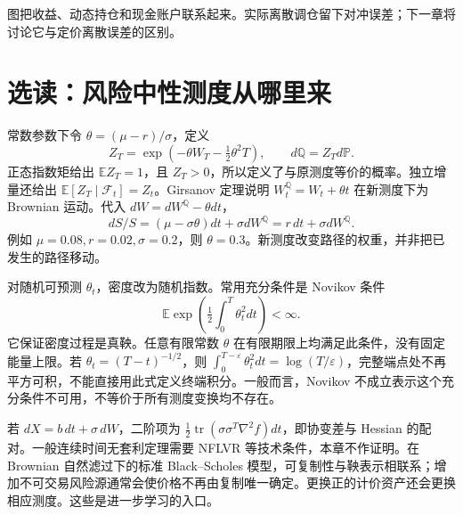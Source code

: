 
图把收益、动态持仓和现金账户联系起来。实际离散调仓留下对冲误差；下一章将讨论它与定价离散误差的区别\cite{black1973pricing,merton1973rational,shreve2004stochastic}。

\section{选读：风险中性测度从哪里来}
常数参数下令 $\theta=(\mu-r)/\sigma$，定义
\[
Z_T=\exp(-\theta W_T-\tfrac12\theta^2T),\qquad d\mathbb Q=Z_Td\mathbb P.
\]
正态指数矩给出 $\mathbb EZ_T=1$，且 $Z_T>0$，所以定义了与原测度等价的概率。独立增量还给出 $\mathbb E[Z_T\mid\mathcal F_t]=Z_t$。Girsanov 定理说明 $W_t^{\mathbb Q}=W_t+\theta t$ 在新测度下为 Brownian 运动。代入 $dW=dW^{\mathbb Q}-\theta dt$，
\[
dS/S=(\mu-\sigma\theta)dt+\sigma dW^{\mathbb Q}=r\,dt+\sigma dW^{\mathbb Q}.
\]
例如 $\mu=0.08,r=0.02,\sigma=0.2$，则 $\theta=0.3$。新测度改变路径的权重，并非把已发生的路径移动。


对随机可预测 $\theta_t$，密度改为随机指数。常用充分条件是 Novikov 条件
\[
\mathbb E\exp\left(\tfrac12\int_0^T\theta_t^2dt\right)<\infty.
\]
它保证密度过程是真鞅。任意有限常数 $\theta$ 在有限期限上均满足此条件，没有固定能量上限。若 $\theta_t=(T-t)^{-1/2}$，则 $\int_0^{T-\varepsilon}\theta_t^2dt=\log(T/\varepsilon)$，完整端点处不再平方可积，不能直接用此式定义终端积分。一般而言，Novikov 不成立表示这个充分条件不可用，不等价于所有测度变换均不存在。

若 $dX=b\,dt+\sigma\,dW$，二阶项为 $\tfrac12\operatorname{tr}(\sigma\sigma^T\nabla^2f)dt$，即协变差与 Hessian 的配对。一般连续时间无套利定理需要 NFLVR 等技术条件，本章不作证明。在 Brownian 自然滤过下的标准 Black--Scholes 模型，可复制性与鞅表示相联系；增加不可交易风险源通常会使价格不再由复制唯一确定。更换正的计价资产还会更换相应测度。这些是进一步学习的入口。


